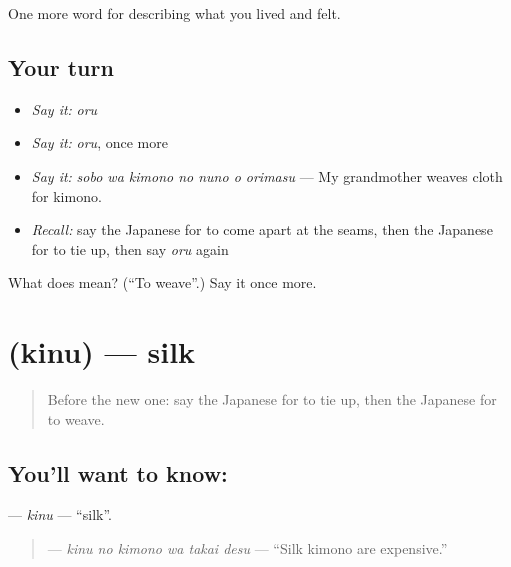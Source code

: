 \begin{grammarlens}[title={What you've built}]
One more word for describing what you lived and felt.
\end{grammarlens}

\subsection*{Your turn}
\begin{itemize}
\raggedright
  \item \emph{Say it:} \emph{oru}
  \item \emph{Say it:} \emph{oru}, once more
  \item \emph{Say it:} \emph{sobo wa kimono no nuno o orimasu} — My grandmother weaves cloth for kimono.
  \item \emph{Recall:} say the Japanese for to come apart at the seams, then the Japanese for to tie up, then say \emph{oru} again
\end{itemize}

\begin{tcolorbox}[breakable,colback=teal!4,colframe=teal!35!black,title={Before you move on}]
What does  mean? (\textquotedblleft{}To weave\textquotedblright{}.) Say it once more.
\end{tcolorbox}
\section[\texorpdfstring{\ja{きぬ} (kinu)}{きぬ (kinu)}]{ (kinu) — silk}

\label{lesson:JA-C485-kinu}



\begin{quote}
Before the new one: say the Japanese for to tie up, then the Japanese for to weave.
\end{quote}

\subsection*{You'll want to know: }
\textbf{} — \emph{kinu} — \textquotedblleft{}silk\textquotedblright{}.

\begin{quote}
\textbf{  } — \emph{kinu no kimono wa takai desu} — \textquotedblleft{}Silk kimono are expensive.\textquotedblright{}
\end{quote}


